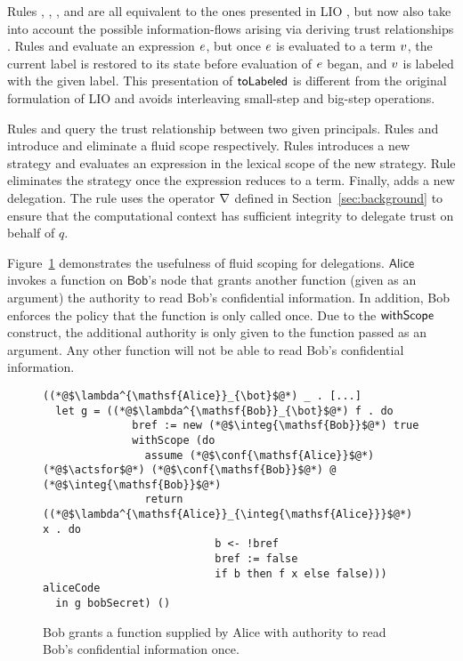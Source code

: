 Rules , , ,  and  are all equivalent to the ones presented in LIO \cite{SRMMlio}, but now also take into account the possible information-flows arising via deriving trust relationships \cite{Arden:2015:FA:2859845.2859998}. Rules  and  evaluate an expression $e$, but once $e$ is evaluated to a term $v$, the current label is restored to its state before evaluation of $e$ began, and $v$ is labeled with the given label. This presentation of $\mathsf{toLabeled}$ is different from the original formulation of LIO \cite{SRMMlio} and avoids interleaving small-step and big-step operations.

Rules  and  query the trust relationship between two given principals. Rules  and  introduce and eliminate a fluid scope respectively. Rules  introduces a new strategy and evaluates an expression in the lexical scope of the new strategy. Rule  eliminates the strategy once the expression reduces to a term. Finally,  adds a new delegation. The rule uses the operator $\nabla$ defined in Section~\ref{sec:background} to ensure that the computational context has sufficient integrity to delegate trust on behalf of $q$.

Figure~\ref{fig:use-case-for-fluid-scope} demonstrates the usefulness of fluid scoping for delegations. $\mathsf{Alice}$ invokes a function on $\mathsf{Bob}$'s node that grants another function (given as an argument) the authority to read Bob's confidential information. In addition, Bob enforces the policy that the function is only called once. Due to the $\mathsf{withScope}$ construct, the additional authority is only given to the function passed as an argument. Any other function will not be able to read Bob's confidential information.

\begin{figure}
\centering
\begin{lstlisting}
((*@$\lambda^{\mathsf{Alice}}_{\bot}$@*) _ . [...]
  let g = ((*@$\lambda^{\mathsf{Bob}}_{\bot}$@*) f . do
              bref := new (*@$\integ{\mathsf{Bob}}$@*) true
              withScope (do
                assume (*@$\conf{\mathsf{Alice}}$@*) (*@$\actsfor$@*) (*@$\conf{\mathsf{Bob}}$@*) @ (*@$\integ{\mathsf{Bob}}$@*)
                return ((*@$\lambda^{\mathsf{Alice}}_{\integ{\mathsf{Alice}}}$@*) x . do
                           b <- !bref
                           bref := false
                           if b then f x else false))) aliceCode
  in g bobSecret) ()
\end{lstlisting}
\caption{Bob grants a function supplied by Alice with authority to read Bob's confidential information once. }
\label{fig:use-case-for-fluid-scope}
\end{figure}

